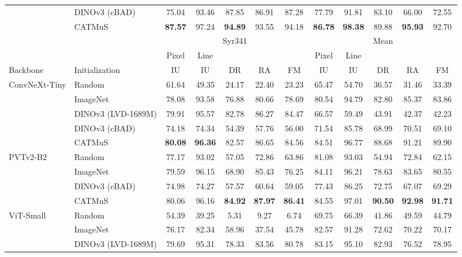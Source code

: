 \begin{table}[htbp]
\begin{tabular*}{\textwidth}{@{\extracolsep{\fill}}ll*{10}{c}@{}}
         & DINOv3 (cBAD) & 75.04 & 93.46 & 87.85 & 86.91 & 87.28 & 77.79 & 91.81 & 83.10 & 66.00 & 72.55 \\
         & CATMuS & \textbf{87.57} & 97.24 & \textbf{94.89} & 93.55 & 94.18 & \textbf{86.78} & \textbf{98.38} & 89.88 & \textbf{95.93} & 92.70 \\
        \midrule
        & & \multicolumn{5}{c}{Syr341} & \multicolumn{5}{c}{Mean} \\
        \cmidrule(lr){3-7}\cmidrule(l){8-12}
        & & Pixel & Line & & & & Pixel & Line & & & \\
        Backbone & Initialization & IU & IU & DR & RA & FM & IU & IU & DR & RA & FM \\
        \midrule
        ConvNeXt-Tiny & Random & 61.64 & 49.35 & 24.17 & 22.40 & 23.23 & 65.47 & 54.70 & 36.57 & 31.46 & 33.39 \\
         & ImageNet & 78.08 & 93.58 & 76.88 & 80.66 & 78.69 & 80.54 & 94.79 & 82.80 & 85.37 & 83.86 \\
         & DINOv3 (LVD-1689M) & 79.91 & 95.57 & 82.78 & 86.27 & 84.47 & 66.57 & 59.49 & 43.91 & 42.37 & 42.23 \\
         & DINOv3 (cBAD) & 74.18 & 74.34 & 54.39 & 57.76 & 56.00 & 71.54 & 85.78 & 68.99 & 70.51 & 69.10 \\
         & CATMuS & \textbf{80.08} & \textbf{96.36} & 82.57 & 86.65 & 84.56 & 84.51 & 96.77 & 88.68 & 91.21 & 89.90 \\
        \addlinespace[1pt]
        PVTv2-B2 & Random & 77.17 & 93.02 & 57.05 & 72.86 & 63.86 & 81.08 & 93.03 & 54.94 & 72.84 & 62.15 \\
         & ImageNet & 79.59 & 96.15 & 68.90 & 85.43 & 76.25 & 84.11 & 96.21 & 78.63 & 83.65 & 80.55 \\
         & DINOv3 (cBAD) & 74.98 & 74.27 & 57.57 & 60.64 & 59.05 & 77.43 & 86.25 & 72.75 & 67.07 & 69.29 \\
         & CATMuS & 80.06 & 96.16 & \textbf{84.92} & \textbf{87.97} & \textbf{86.41} & 84.55 & 97.01 & \textbf{90.50} & \textbf{92.98} & \textbf{91.71} \\
        \addlinespace[1pt]
        ViT-Small & Random & 54.39 & 39.25 & 5.31 & 9.27 & 6.74 & 69.75 & 66.39 & 41.86 & 49.59 & 44.79 \\
         & ImageNet & 76.17 & 82.34 & 58.96 & 37.54 & 45.78 & 82.57 & 91.28 & 72.62 & 70.22 & 70.17 \\
         & DINOv3 (LVD-1689M) & 79.69 & 95.31 & 78.33 & 83.56 & 80.78 & 83.15 & 95.10 & 82.93 & 76.52 & 78.95 \\

\end{tabular*}
\end{table}
